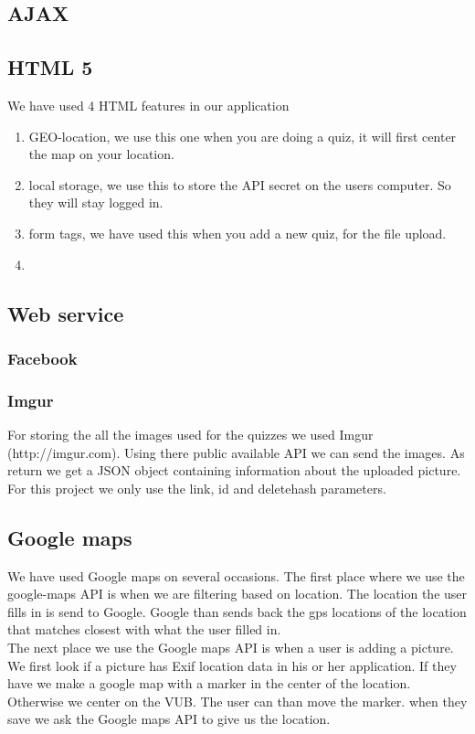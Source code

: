 \documentclass[11pt, oneside]{article}   	%
\begin{document}
\subsection{AJAX}

\subsection{HTML 5}
We have used 4 HTML features in our application
\begin{enumerate}
\item GEO-location, we use this one when you are doing a quiz, it will first center the map on your location.
\item local storage, we use this to store the API secret on the users computer. So they will stay logged in.
\item form tags, we have used this when you add a new quiz, for the file upload.
\item %
\end{enumerate}


\subsection{Web service}
\subsubsection{Facebook}
\subsubsection{Imgur}
For storing the all the images used for the quizzes we used Imgur (http://imgur.com). Using there public available API we can send the images. As return we get a JSON object containing information about the uploaded picture. For this project we only use the link, id and deletehash parameters.

\subsection{Google maps}
We have used Google maps on several occasions.
The first place where we use the google-maps API is when we are filtering based on location. The location the user fills in is send to Google. Google than sends back the gps locations of the location that matches closest with what the user filled in. \\

The next place we use the Google maps API is when a user is adding a picture. We first look if a picture has Exif location data in his or her application. If they have we make a google map with a marker in the center of the location. Otherwise we center on the VUB. The user can than move the marker. when they save we ask the Google maps API to give us the location. \\
\end{document}
